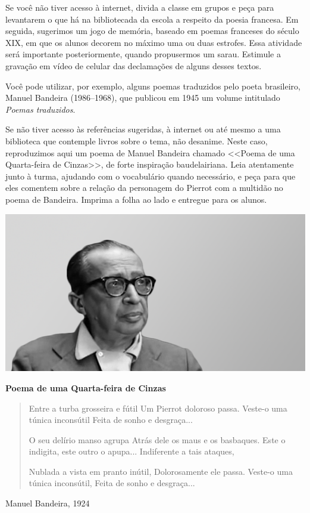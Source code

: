 \documentclass[12pt]{extarticle}
\begin{document}
Se você não tiver acesso à internet, divida a classe em grupos e 
peça para levantarem o que há na bibliotecada da escola a respeito da poesia 
francesa. Em seguida, sugerimos um jogo de memória, 
baseado em poemas franceses do século
XIX, em que os alunos decorem no máximo uma ou duas estrofes. 
Essa atividade será importante posteriormente, 
quando propusermos um sarau. Estimule a gravação em vídeo de celular das declamações
de alguns desses textos. 

Você pode utilizar, por exemplo, alguns poemas
traduzidos pelo poeta brasileiro, Manuel Bandeira (1986--1968), 
que publicou em 1945 um volume intitulado \textit{Poemas traduzidos}. 

Se não tiver acesso às referências sugeridas, à internet ou até mesmo a uma 
biblioteca que contemple livros sobre o tema, não desanime. 
Neste caso, reproduzimos aqui um poema de Manuel Bandeira chamado <<Poema de uma 
Quarta-feira de Cinzas>>, de forte inspiração baudelairiana. Leia atentamente 
junto à turma, ajudando com o vocabulário quando necessário, e peça para 
que eles comentem sobre a relação da personagem do Pierrot com a multidão
no poema de Bandeira. Imprima a folha ao lado e entregue para os alunos.

\pagebreak
\includegraphics[width=.8\textwidth]{./images/PNLD0010-22}

\textbf{Poema de uma Quarta-feira de Cinzas}
\thispagestyle{empty}
\begin{verse}

Entre a turba grosseira e fútil
Um Pierrot doloroso passa.
Veste-o uma túnica inconsútil
Feita de sonho e desgraça...

O seu delírio manso agrupa
Atrás dele os maus e os basbaques.
Este o indigita, este outro o apupa...
Indiferente a tais ataques,

Nublada a vista em pranto inútil,
Dolorosamente ele passa.
Veste-o uma túnica inconsútil,
Feita de sonho e desgraça... 

\end{verse}
\bigskip \hfill Manuel Bandeira, 1924
\end{document}
